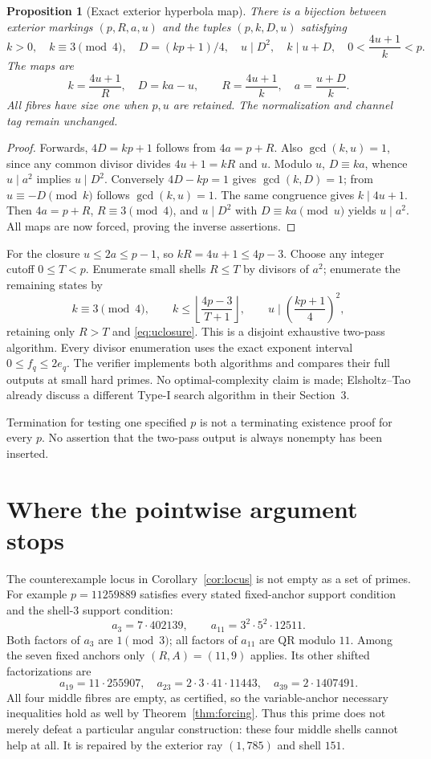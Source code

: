 \documentclass[11pt]{article}
\newtheorem{proposition}[theorem]{Proposition}
\theoremstyle{definition}\newtheorem{definition}[theorem]{Definition}
\theoremstyle{remark}\newtheorem{remark}[theorem]{Remark}
\begin{document}
\begin{proposition}[Exact exterior hyperbola map]\label{prop:hyperbola}
There is a bijection between exterior markings $(p,R,a,u)$ and the tuples $(p,k,D,u)$ satisfying
\[
 k>0,\quad k\equiv3\pmod4,\quad D=(kp+1)/4,\quad
 u\mid D^2,\quad k\mid u+D,
 \quad0<\frac{4u+1}{k}<p.
\]
The maps are
\[
 k=\frac{4u+1}{R},\quad D=ka-u,
 \qquad
 R=\frac{4u+1}{k},\quad a=\frac{u+D}{k}.
\]
All fibres have size one when $p,u$ are retained. The normalization and channel tag remain unchanged.
\end{proposition}
\begin{proof}
Forwards, $4D=kp+1$ follows from $4a=p+R$. Also $\gcd(k,u)=1$, since any common divisor divides $4u+1=kR$ and $u$. Modulo $u$, $D\equiv ka$, whence $u\mid a^2$ implies $u\mid D^2$.
Conversely $4D-kp=1$ gives $\gcd(k,D)=1$; from $u\equiv-D\pmod k$ follows $\gcd(k,u)=1$. The same congruence gives $k\mid4u+1$. Then $4a=p+R$, $R\equiv3\pmod4$, and $u\mid D^2$ with $D\equiv ka\pmod u$ yields $u\mid a^2$. All maps are now forced, proving the inverse assertions.
\end{proof}

For the closure $u\le2a\le p-1$, so $kR=4u+1\le4p-3$. Choose any integer cutoff $0\le T<p$. Enumerate small shells $R\le T$ by divisors of $a^2$; enumerate the remaining states by
\[
 k\equiv3\pmod4,\qquad
 k\le\left\lfloor\frac{4p-3}{T+1}\right\rfloor,
 \qquad u\mid\left(\frac{kp+1}{4}\right)^2,
\]
retaining only $R>T$ and \eqref{eq:uclosure}. This is a disjoint exhaustive two-pass algorithm. Every divisor enumeration uses the exact exponent interval $0\le f_q\le2e_q$. The verifier implements both algorithms and compares their full outputs at small hard primes. No optimal-complexity claim is made; Elsholtz--Tao already discuss a different Type-I search algorithm in their Section~3.

Termination for testing one specified $p$ is not a terminating existence proof for every $p$. No assertion that the two-pass output is always nonempty has been inserted.

\section{Where the pointwise argument stops}\label{sec:stop}
The counterexample locus in Corollary~\ref{cor:locus} is not empty as a set of primes. For example $p=11259889$ satisfies every stated fixed-anchor support condition and the shell-$3$ support condition:
\[
 a_3=7\cdot402139,
 \qquad a_{11}=3^2\cdot5^2\cdot12511.
\]
Both factors of $a_3$ are $1\pmod3$; all factors of $a_{11}$ are QR modulo $11$. Among the seven fixed anchors only $(R,A)=(11,9)$ applies. Its other shifted factorizations are
\[
 a_{19}=11\cdot255907,\quad
 a_{23}=2\cdot3\cdot41\cdot11443,\quad
 a_{39}=2\cdot1407491.
\]
All four middle fibres are empty, as certified, so the variable-anchor necessary inequalities hold as well by Theorem~\ref{thm:forcing}. Thus this prime does not merely defeat a particular angular construction: these four middle shells cannot help at all. It is repaired by the exterior ray $(1,785)$ and shell $151$.
\end{document}
